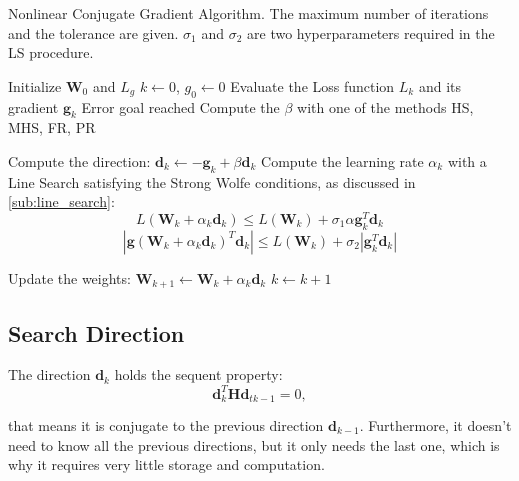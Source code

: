 		\begin{algorithm}[H]
			\caption{Nonlinear Conjugate Gradient Algorithm. The maximum number of iterations and the tolerance are given. $\sigma_1$ and $\sigma_2$ are two hyperparameters required in the LS procedure.}
			\label{alg:cgd}
			\begin{algorithmic}[1]
					\State Initialize $\textbf{W}_0$ and $\textit{L}_g$
					\State $k \gets 0$, $g_0 \gets 0$
						\State Evaluate the Loss function $\textit{L}_k$ and its gradient $\textbf{g}_k$
							\State
							\Return Error goal reached
						\EndIf
						\State Compute the $\beta$ with one of the methods HS, MHS, FR, PR

						\State Compute the direction: $\textbf{d}_k \gets - \textbf{g}_k + \beta\textbf{d}_k$
						\State Compute the learning rate $\alpha_k$ with a Line Search satisfying the Strong Wolfe conditions, as discussed in \ref{sub:line_search}:
						\begin{equation*}
							\textit{L}(\textbf{W}_k+\alpha _k\textbf{d}_k)\leq \textit{L}(\textbf{W}_k)+\sigma_1\alpha\textbf{g}_k^T\textbf{d}_k
						\end{equation*}
						\begin{equation*}
							|\textbf{g}(\textbf{W}_k+\alpha_k\textbf{d}_k)^T\textbf{d}_k|\leq \textit{L}(\textbf{W}_k)+\sigma_2|\textbf{g}_k^T\textbf{d}_k|
						\end{equation*}

						\State Update the weights: $\textbf{W}_{k+1} \gets \textbf{W}_{k} + \alpha_k\textbf{d}_k$
						\State $k \gets k + 1$
					\EndWhile
				\EndProcedure
			\end{algorithmic}
		\end{algorithm}


		\subsection{Search Direction}
		\label{sub:search_direction}
			The direction $\textbf{d}_k$ holds the sequent property:
			\begin{equation}
			\textbf{d}_k^T\textbf{H}\textbf{d}_{tk-1} = 0,
			\end{equation}

		 	that means it is conjugate to the previous direction $\textbf{d}_{k-1}$. Furthermore, it doesn't need to know all the 	previous directions, but it only needs the last one, which is why it requires very little storage and computation.

